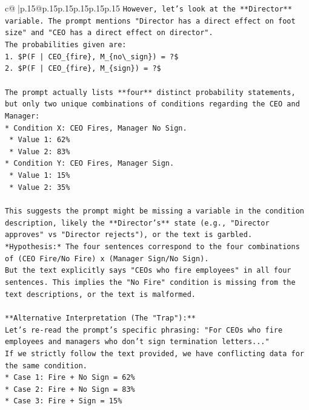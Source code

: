 \documentclass{article}
\begin{document}
{\begin{supertabular}{c@{$\;$}|p{.15\linewidth}@{}p{.15\linewidth}p{.15\linewidth}p{.15\linewidth}p{.15\linewidth}p{.15\linewidth}}
{{{\texttt{However, let's look at the **Director** variable. The prompt mentions "Director has a direct effect on foot size" and "CEO has a direct effect on director".} \\
\texttt{The probabilities given are:} \\
\texttt{1.  \$P(F | CEO\_\{fire\}, M\_\{no\textbackslash{}\_sign\}) = ?\$} \\
\texttt{2.  \$P(F | CEO\_\{fire\}, M\_\{sign\}) = ?\$} \\
\\ 
\texttt{The prompt actually lists **four** distinct probability statements, but only two unique combinations of conditions regarding the CEO and Manager:} \\
\texttt{*   Condition X: CEO Fires, Manager No Sign.} \\
\texttt{    *   Value 1: 62\%} \\
\texttt{    *   Value 2: 83\%} \\
\texttt{*   Condition Y: CEO Fires, Manager Sign.} \\
\texttt{    *   Value 1: 15\%} \\
\texttt{    *   Value 2: 35\%} \\
\\ 
\texttt{This suggests the prompt might be missing a variable in the condition description, likely the **Director's** state (e.g., "Director approves" vs "Director rejects"), or the text is garbled.} \\
\texttt{*Hypothesis:* The four sentences correspond to the four combinations of (CEO Fire/No Fire) x (Manager Sign/No Sign).} \\
\texttt{But the text explicitly says "CEOs who fire employees" in all four sentences. This implies the "No Fire" condition is missing from the text descriptions, or the text is malformed.} \\
\\ 
\texttt{**Alternative Interpretation (The "Trap"):**} \\
\texttt{Let's re{-}read the prompt's specific phrasing: "For CEOs who fire employees and managers who don't sign termination letters..."} \\
\texttt{If we strictly follow the text provided, we have conflicting data for the same condition.} \\
\texttt{*   Case 1: Fire + No Sign = 62\%} \\
\texttt{*   Case 2: Fire + No Sign = 83\%} \\
\texttt{*   Case 3: Fire + Sign = 15\%} \\
}}}
\end{supertabular}}
\end{document}
